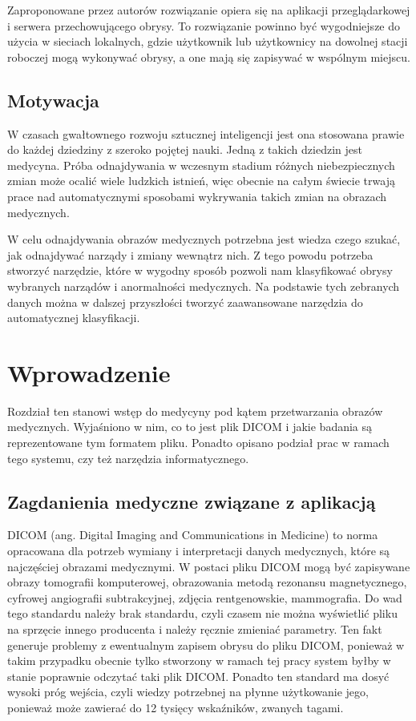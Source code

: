 \documentclass[a4paper,11pt,twoside,openright]{report}
\theoremstyle{definition}
\begin{document}
Zaproponowane przez autorów rozwiązanie opiera się na aplikacji przeglądarkowej i serwera przechowującego obrysy. To rozwiązanie powinno być wygodniejsze do użycia w sieciach lokalnych, gdzie użytkownik lub użytkownicy na dowolnej stacji roboczej mogą wykonywać obrysy, a one mają się zapisywać w wspólnym miejscu.

\section*{Motywacja}

W czasach gwałtownego rozwoju sztucznej inteligencji jest ona stosowana prawie do każdej dziedziny z szeroko pojętej nauki. Jedną z takich dziedzin jest medycyna. Próba odnajdywania w wczesnym stadium różnych niebezpiecznych zmian może ocalić wiele ludzkich istnień, więc obecnie na całym świecie trwają prace nad automatycznymi sposobami wykrywania takich zmian na obrazach medycznych.

W celu odnajdywania obrazów medycznych potrzebna jest wiedza czego szukać, jak odnajdywać narządy i zmiany wewnątrz nich. Z tego powodu potrzeba stworzyć narzędzie, które w wygodny sposób pozwoli nam klasyfikować obrysy wybranych narządów i anormalności medycznych. Na podstawie tych zebranych danych można w dalszej przyszłości tworzyć zaawansowane narzędzia do automatycznej klasyfikacji.

\chapter {Wprowadzenie}

Rozdział ten stanowi wstęp do medycyny pod kątem przetwarzania obrazów medycznych. Wyjaśniono w nim, co to jest plik DICOM i jakie badania są reprezentowane tym formatem pliku. Ponadto opisano podział prac w ramach tego systemu, czy też narzędzia informatycznego.

\section {Zagdanienia medyczne związane z aplikacją}

DICOM (ang. Digital Imaging and Communications in Medicine) \cite{DICOM} to norma opracowana dla potrzeb wymiany i interpretacji danych medycznych, które są najczęściej obrazami medycznymi. W postaci pliku DICOM mogą być zapisywane obrazy tomografii komputerowej, obrazowania metodą rezonansu magnetycznego, cyfrowej angiografii subtrakcyjnej, zdjęcia rentgenowskie, mammografia. Do wad tego standardu należy brak standardu, czyli czasem nie można wyświetlić pliku na sprzęcie innego producenta i należy ręcznie zmieniać parametry. Ten fakt generuje problemy z ewentualnym zapisem obrysu do pliku DICOM, ponieważ w takim przypadku obecnie tylko stworzony w ramach tej pracy system byłby w stanie poprawnie odczytać taki plik DICOM. Ponadto ten standard ma dosyć wysoki próg wejścia, czyli wiedzy potrzebnej na płynne użytkowanie jego, ponieważ może zawierać do 12 tysięcy wskaźników, zwanych tagami.
\end{document}
